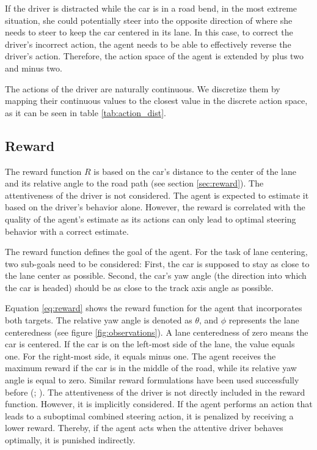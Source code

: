 If the driver is distracted while the car is in a road bend, in the most extreme situation, she could potentially steer into the opposite direction of where she needs to steer to keep the car centered in its lane. In this case, to correct the driver's incorrect action, the agent needs to be able to effectively reverse the driver's action. Therefore, the action space of the agent is extended by plus two and minus two.



\label{sec:driver_act_discr}
\noindent
The actions of the driver are naturally continuous. We discretize them by mapping their continuous values to the closest value in the discrete action space, as it can be seen in table \ref{tab:action_dist}.



\subsection{Reward}

The reward function $R$ is based on the car's distance to the center of the lane and its relative angle to the road path (see section \ref{sec:reward}). The attentiveness of the driver is not considered. The agent is expected to estimate it based on the driver's behavior alone. However, the reward is correlated with the quality of the agent's estimate as its actions can only lead to optimal steering behavior with a correct estimate.

\label{sec:reward}

The reward function defines the goal of the agent. For the task of lane centering, two sub-goals need to be considered: First, the car is supposed to stay as close to the lane center as possible. Second, the car's yaw angle (the direction into which the car is headed) should be as close to the track axis angle as possible. 

Equation \ref{eq:reward} shows the reward function for the agent that incorporates both targets. The relative yaw angle is denoted as $\theta$, and $\phi$ represents the lane centeredness (see figure \ref{fig:observations}). A lane centeredness of zero means the car is centered. If the car is on the left-most side of the lane, the value equals one. For the right-most side, it equals minus one. The agent receives the maximum reward if the car is in the middle of the road, while its relative yaw angle is equal to zero. Similar reward formulations have been used successfully before (\cite{reward1}; \cite{reward2}). The attentiveness of the driver is not directly included in the reward function. However, it is implicitly considered. If the agent performs an action that leads to a suboptimal combined steering action, it is penalized by receiving a lower reward. Thereby, if the agent acts when the attentive driver behaves optimally, it is punished indirectly.

